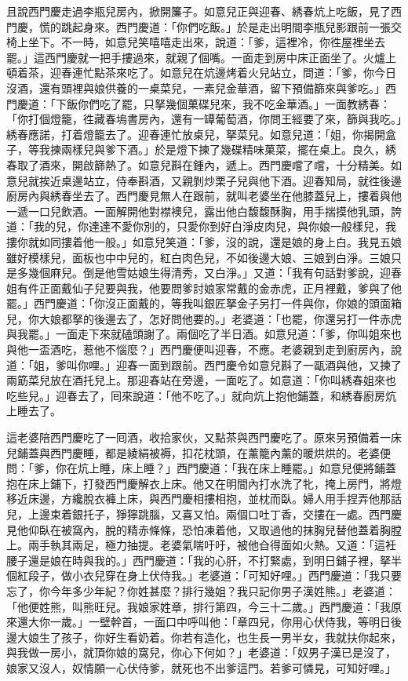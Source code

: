 且說西門慶走過李瓶兒房內，掀開簾子。如意兒正與迎春、綉春炕上吃飯，見了西門慶，慌的跳起身來。西門慶道：「你們吃飯。」於是走出明間李瓶兒影跟前一張交椅上坐下。不一時，如意兒笑嘻嘻走出來，說道：「爹，這裡冷，你徃屋裡坐去罷。」這西門慶就一把手摟過來，就親了個嘴。一面走到房中床正面坐了。火爐上頓着茶，迎春連忙點茶來吃了。如意兒在炕邊烤着火兒站立，問道：「爹，你今日沒酒，還有頭裡與娘供養的一桌菜兒，一素兒金華酒，留下預備篩來與爹吃。」西門慶道：「下飯你們吃了罷，只拏幾個菓碟兒來，我不吃金華酒。」一面教綉春：「你打個燈籠，徃藏春塢書房內，還有一罈葡萄酒，你問王經要了來，篩與我吃。」綉春應諾，打着燈籠去了。迎春連忙放桌兒，拏菜兒。如意兒道：「姐，你揭開盒子，等我揀兩樣兒與爹下酒。」於是燈下揀了幾碟精味菓菜，擺在桌上。良久，綉春取了酒來，開啟篩熱了。如意兒斟在鍾內，遞上。西門慶嚐了嚐，十分精美。如意兒就挨近桌邊站立，侍奉斟酒，又親剝炒栗子兒與他下酒。迎春知局，就徃後邊廚房內與綉春坐去了。西門慶見無人在跟前，就叫老婆坐在他膝蓋兒上，摟着與他一遞一口兒飲酒。{}一面解開他對襟襖兒，露出他白馥馥酥胸，用手揣摸他乳頭，誇道：「我的兒，你達達不愛你別的，只愛你到好白淨皮肉兒，與你娘一般樣兒，我摟你就如同摟着他一般。」如意兒笑道：「爹，沒的說，還是娘的身上白。我見五娘雖好模樣兒，面板也中中兒的，紅白肉色兒，不如後邊大娘、三娘到白淨。三娘只是多幾個麻兒。倒是他雪姑娘生得清秀，又白淨。」{}又道：「我有句話對爹說，迎春姐有件正面戴仙子兒要與我，他要問爹討娘家常戴的金赤虎，正月裡戴，爹與了他罷。」西門慶道：「你沒正面戴的，等我叫銀匠拏金子另打一件與你，你娘的頭面箱兒，你大娘都拏的後邊去了，怎好問他要的。」老婆道：「也罷，你還另打一件赤虎與我罷。」一面走下來就磕頭謝了。兩個吃了半日酒。如意兒道：「爹，你叫姐來也與他一盃酒吃，惹他不惱麼？」西門慶便叫迎春，不應。老婆親到走到廚房內，說道：「姐，爹叫你哩。」迎春一面到跟前。西門慶令如意兒斟了一甌酒與他，又揀了兩筯菜兒放在酒托兒上。那迎春站在旁邊，一面吃了。如意道：「你叫綉春姐來也吃些兒。」迎春去了，囘來說道：「他不吃了。」就向炕上抱他鋪蓋，和綉春廚房炕上睡去了。

這老婆陪西門慶吃了一囘酒，收拾家伙，又點茶與西門慶吃了。原來另預備着一床兒鋪蓋與西門慶睡，都是綾絹被褥，扣花枕頭，在薰籠內薰的暖烘烘的。老婆便問：「爹，你在炕上睡，床上睡？」西門慶道：「我在床上睡罷。」如意兒便將鋪蓋抱在床上鋪下，打發西門慶解衣上床。他又在明間內打水洗了牝，掩上房門，將燈移近床邊，方纔脫衣褲上床，與西門慶相摟相抱，並枕而臥。婦人用手捏弄他那話兒，上邊束着銀托子，猙獰跳腦，又喜又怕。兩個口吐丁香，交摟在一處。西門慶見他仰臥在被窩內，脫的精赤條條，恐怕凍着他，又取過他的抹胸兒替他蓋着胸膛上。兩手執其兩足，極力抽提。老婆氣喘吁吁，被他㒲得面如火熱。又道：「這衽腰子還是娘在時與我的。」西門慶道：「我的心肝，不打緊處，到明日鋪子裡，拏半個紅段子，做小衣兒穿在身上伏侍我。」老婆道：「可知好哩。」西門慶道：「我只要忘了，你今年多少年紀？你姓甚麼？排行幾姐？我只記你男子漢姓熊。」老婆道：「他便姓熊，叫熊旺兒。我娘家姓章，排行第四，今三十二歲。」西門慶道：「我原來還大你一歲。」一壁幹首，一面口中呼叫他：「章四兒，你用心伏侍我，等明日後邊大娘生了孩子，你好生看奶着。你若有造化，也生長一男半女，我就扶你起來，與我做一房小，就頂你娘的窩兒，你心下何如？」老婆道：「奴男子漢已是沒了，娘家又沒人，奴情願一心伏侍爹，就死也不出爹這門。若爹可憐見，可知好哩。」


